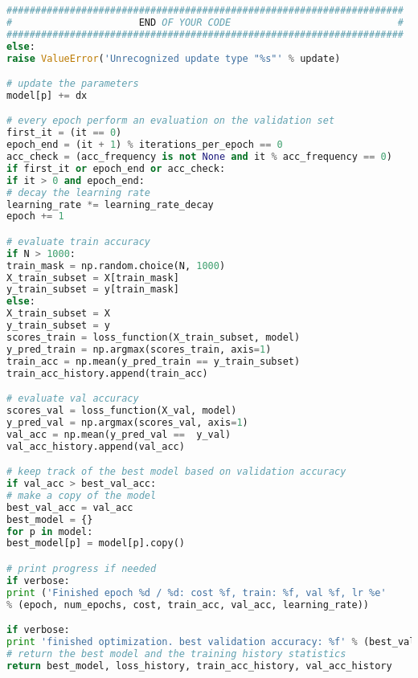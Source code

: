 \begin{lstlisting}[language=Python, label=lst:classifiertrainer.py, caption={classifier\_trainer.py}, basicstyle=\tiny]
#####################################################################
#                      END OF YOUR CODE                             #
#####################################################################
else:
raise ValueError('Unrecognized update type "%s"' % update)

# update the parameters
model[p] += dx

# every epoch perform an evaluation on the validation set
first_it = (it == 0)
epoch_end = (it + 1) % iterations_per_epoch == 0
acc_check = (acc_frequency is not None and it % acc_frequency == 0)
if first_it or epoch_end or acc_check:
if it > 0 and epoch_end:
# decay the learning rate
learning_rate *= learning_rate_decay
epoch += 1

# evaluate train accuracy
if N > 1000:
train_mask = np.random.choice(N, 1000)
X_train_subset = X[train_mask]
y_train_subset = y[train_mask]
else:
X_train_subset = X
y_train_subset = y
scores_train = loss_function(X_train_subset, model)
y_pred_train = np.argmax(scores_train, axis=1)
train_acc = np.mean(y_pred_train == y_train_subset)
train_acc_history.append(train_acc)

# evaluate val accuracy
scores_val = loss_function(X_val, model)
y_pred_val = np.argmax(scores_val, axis=1)
val_acc = np.mean(y_pred_val ==  y_val)
val_acc_history.append(val_acc)

# keep track of the best model based on validation accuracy
if val_acc > best_val_acc:
# make a copy of the model
best_val_acc = val_acc
best_model = {}
for p in model:
best_model[p] = model[p].copy()

# print progress if needed
if verbose:
print ('Finished epoch %d / %d: cost %f, train: %f, val %f, lr %e'
% (epoch, num_epochs, cost, train_acc, val_acc, learning_rate))

if verbose:
print 'finished optimization. best validation accuracy: %f' % (best_val_acc, )
# return the best model and the training history statistics
return best_model, loss_history, train_acc_history, val_acc_history
\end{lstlisting}









